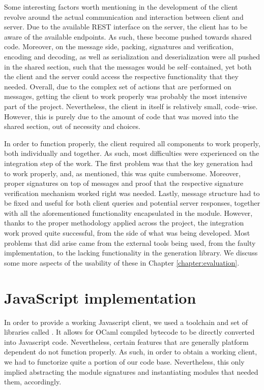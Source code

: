 Some interesting factors worth mentioning in the development of the client revolve around the actual communication and interaction between client and server.
Due to the available REST interface on the server, the client has to be aware of the available endpoints.
As such, these become pushed towards shared code.
Moreover, on the message side, packing, signatures and verification, encoding and decoding, as well as serialization and deserialization were all pushed in the shared section, such that the messages would be self--contained, yet both the client and the server could access the respective functionality that they needed.
Overall, due to the complex set of actions that are performed on messages, getting the client to work properly was probably the most intensive part of the project.
Nevertheless, the client in itself is relatively small, code--wise.
However, this is purely due to the amount of code that was moved into the shared section, out of necessity and choices.

In order to function properly, the client required all components to work properly, both individually and together.
As such, most difficulties were experienced on the integration step of the work.
The first problem was that the  key generation had to work properly, and, as mentioned, this was quite cumbersome.
Moreover, proper  signatures on top of messages and proof that the respective signature verification mechanism worked right was needed.
Lastly, message structure had to be fixed and useful for both client queries and potential server responses, together with all the aforementioned functionality encapsulated in the  module.
However, thanks to the proper methodology applied across the project, the integration work proved quite successful, from the side of what was being developed.
Most problems that did arise came from the external tools being used, from the faulty  implementation, to the lacking functionality in the  generation library.
We discuss some more aspects of the usability of these in Chapter \ref{chapter:evaluation}.

\section{JavaScript implementation}
In order to provide a working Javascript client, we used a toolchain and set of libraries called .
It allows for OCaml compiled bytecode to be directly converted into Javascript code.
Nevertheless, certain features that are generally platform dependent do not function properly.
As such, in order to obtain a working client, we had to functorize quite a portion of our code base.
Nevertheless, this only implied abstracting the module signatures and instantiating modules that needed them, accordingly.


